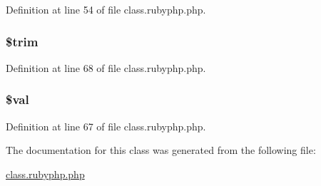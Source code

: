 Definition at line 54 of file class.\-rubyphp.\-php.

\hypertarget{class_pierce_moore_1_1_ruby_p_h_p_1_1r_a0ca8b395aaa07c4aac3bdb1f9964d4f5}{
\subsubsection[{\$trim}]{\setlength{\rightskip}{0pt plus 5cm}\$trim}}\label{class_pierce_moore_1_1_ruby_p_h_p_1_1r_a0ca8b395aaa07c4aac3bdb1f9964d4f5}


Definition at line 68 of file class.\-rubyphp.\-php.

\hypertarget{class_pierce_moore_1_1_ruby_p_h_p_1_1r_aac81a74a7b30767af29bfd9a695636df}{
\subsubsection[{\$val}]{\setlength{\rightskip}{0pt plus 5cm}\${\bf val}}}\label{class_pierce_moore_1_1_ruby_p_h_p_1_1r_aac81a74a7b30767af29bfd9a695636df}


Definition at line 67 of file class.\-rubyphp.\-php.



The documentation for this class was generated from the following file\-:\begin{DoxyCompactItemize}
\item 
\hyperlink{class_8rubyphp_8php}{class.\-rubyphp.\-php}\end{DoxyCompactItemize}
